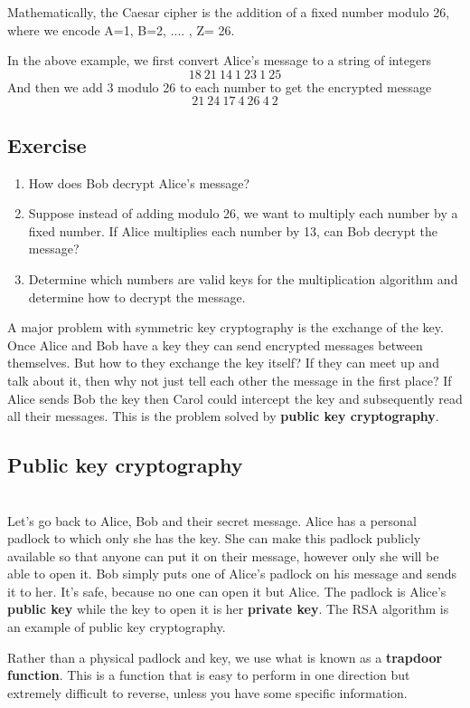 \documentclass[12pt]{amsart}
\theoremstyle{definition}
\theoremstyle{definition}
\theoremstyle{remark}
\begin{document}
Mathematically, the Caesar cipher is the addition of a fixed number modulo 26, where we encode A=1, B=2, .... , Z= 26. 

In the above example, we first convert Alice's message to a string of integers
\[18\: 21\: 14\: 1\: 23\: 1\: 25\]
And then we add 3 modulo 26 to each number to get the encrypted message
\[21\: 24\: 17\: 4\: 26\: 4\: 2\] 
\subsection*{Exercise}
\begin{enumerate}
\item How does Bob decrypt Alice's message?
\item Suppose instead of adding modulo 26, we want to multiply each number by a fixed number. If Alice multiplies each number by 13, can Bob decrypt the message?
\item Determine which numbers are valid keys for the multiplication algorithm and determine how to decrypt the message.
\end{enumerate}


A major problem with symmetric key cryptography is the exchange of the key. Once Alice and Bob have a key they can send encrypted messages between themselves. But how to they exchange the key itself? If they can meet up and talk about it, then why not just tell each other the message in the first place? If Alice sends Bob the key then Carol could intercept the key and subsequently read all their messages. This is the problem solved by \textbf{public key cryptography}.



\subsection*{Public key cryptography}
\hfill \\
Let's go back to Alice, Bob and their secret message. Alice has a personal padlock to which only she has the key. She can make this padlock publicly available so that anyone can put it on their message, however only she will be able to open it. Bob simply puts one of Alice's padlock on his message and sends it to her. It's safe, because no one can open it but Alice. The padlock is Alice's \textbf{public key} while the key to open it is her \textbf{private key}. The RSA algorithm is an example of public key cryptography.

Rather than a physical padlock and key, we use what is known as a \textbf{trapdoor function}. This is a function that is easy to perform in one direction but extremely difficult to reverse, unless you have some specific information.
\end{document}
